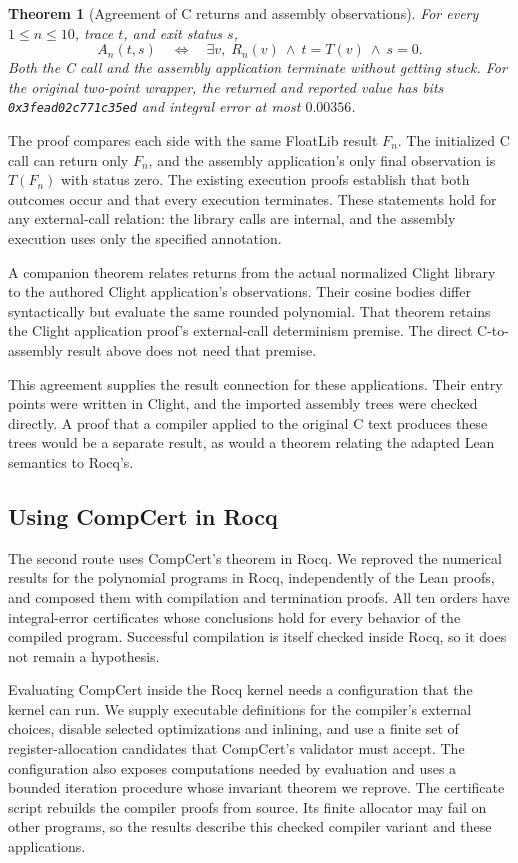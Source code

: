 \documentclass[11pt]{article}
\newtheorem{theorem}{Theorem}[section]
\newcommand{\code}[1]{%
  \ifmmode\text{\texttt{\detokenize{#1}}}\else\nolinkurl{#1}\fi}
\begin{document}
\begin{theorem}[Agreement of C returns and assembly observations]
\label{thm:c-assembly-observations}
For every $1\le n\le10$, trace $t$, and exit status $s$,
\[
  A_n(t,s)
  \quad\Longleftrightarrow\quad
  \exists v,\; R_n(v)\ \land\ t=T(v)\ \land\ s=0.
\]
Both the C call and the assembly application terminate without getting
stuck. For the original two-point wrapper, the returned and reported value
has bits \code{0x3fead02c771c35ed} and integral error at most $0.00356$.
\end{theorem}

The proof compares each side with the same FloatLib result $F_n$.
The initialized C call can return only $F_n$, and the assembly application's
only final observation is $T(F_n)$ with status zero. The existing execution
proofs establish that both outcomes occur and that every execution
terminates. These statements hold for any external-call relation: the
library calls are internal, and the assembly execution uses only the
specified annotation.

A companion theorem relates returns from the actual normalized Clight
library to the authored Clight application's observations. Their cosine
bodies differ syntactically but evaluate the same rounded polynomial.
That theorem retains the Clight application proof's external-call
determinism premise. The direct C-to-assembly result above does not need
that premise.

This agreement supplies the result connection for these applications.
Their entry points were written in Clight, and the imported assembly trees
were checked directly. A proof that a compiler applied to the original C
text produces these trees would be a separate result, as would a theorem
relating the adapted Lean semantics to Rocq's.

\subsection{Using CompCert in Rocq}

The second route uses CompCert's theorem in Rocq. We reproved the numerical
results for the polynomial programs in
Rocq, independently of the Lean proofs, and composed them with compilation
and termination proofs. All ten orders have integral-error certificates
whose conclusions hold for every behavior of the compiled program.
Successful compilation is itself checked inside Rocq, so it does not remain
a hypothesis.

Evaluating CompCert inside the Rocq kernel needs a configuration that the
kernel can run. We supply executable definitions for the compiler's
external choices, disable selected optimizations and inlining, and use a
finite set of register-allocation candidates that CompCert's validator must
accept. The configuration also exposes computations needed by evaluation
and uses a bounded iteration procedure whose invariant theorem we reprove.
The certificate script rebuilds the compiler proofs from source. Its finite
allocator may fail on other programs, so the results describe this checked
compiler variant and these applications.
\end{document}
